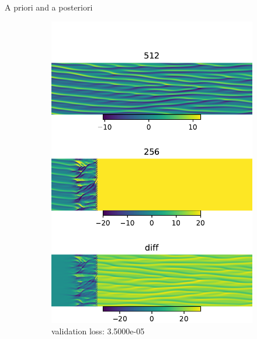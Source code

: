 \documentclass[paper slide]{beamer}
\begin{document}
\begin{frame}{A priori and a posteriori}
	\begin{figure}[ht]
		\centering
		\begin{subfigure}[b]{0.32\textwidth}
			\centering 
			\includegraphics[width=\textwidth]
			{fig/ks_nu0.1_N1512N2256_correct_cmp_lr1e-4.pdf} 
			\caption{validation loss: 3.5000e-05} 
		\end{subfigure}
		\begin{subfigure}[b]{0.32\textwidth}
			\centering 

\end{subfigure}
\end{figure}
\end{frame}
\end{document}
